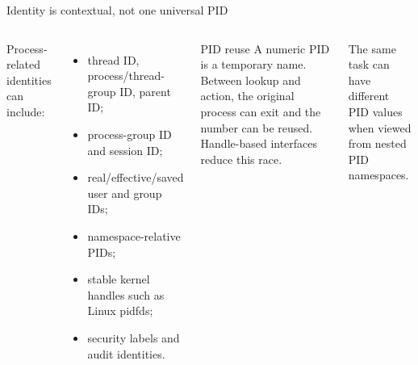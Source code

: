 \documentclass[aspectratio=169,11pt]{beamer}
\begin{document}
\begin{frame}{Identity is contextual, not one universal PID}
  \begin{columns}[T,onlytextwidth]
      Process-related identities can include:
      \begin{itemize}
        \item thread ID, process/thread-group ID, parent ID;
        \item process-group ID and session ID;
        \item real/effective/saved user and group IDs;
        \item namespace-relative PIDs;
        \item stable kernel handles such as Linux pidfds;
        \item security labels and audit identities.
      \end{itemize}
      \begin{alertblock}{PID reuse}
        A numeric PID is a temporary name. Between lookup and action, the original process can exit and the number can be reused. Handle-based interfaces reduce this race.
      \end{alertblock}
      \begin{tcolorbox}[title=Namespace consequence]
        The same task can have different PID values when viewed from nested PID namespaces.
      \end{tcolorbox}
  \end{columns}
\end{frame}
\end{document}
